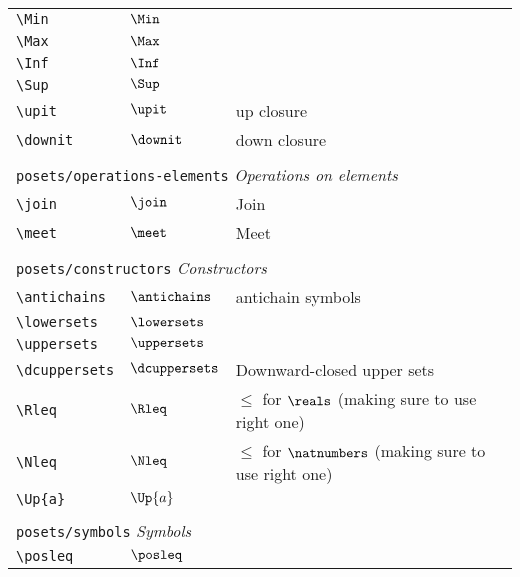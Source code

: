 \begin{longtable}{lll}
 \hline
{\color[rgb]{0.5,0.5,0.5}\texttt{\textbackslash Min}} & $\Min$ & \\ 
 {\color[rgb]{0.5,0.5,0.5}\texttt{\textbackslash Max}} & $\Max$ & \\ 
 {\color[rgb]{0.5,0.5,0.5}\texttt{\textbackslash Inf}} & $\Inf$ & \\ 
 {\color[rgb]{0.5,0.5,0.5}\texttt{\textbackslash Sup}} & $\Sup$ & \\ 
 {\color[rgb]{0.5,0.5,0.5}\texttt{\textbackslash upit}} & $\upit$ &  up closure\\ 
 {\color[rgb]{0.5,0.5,0.5}\texttt{\textbackslash downit}} & $\downit$ &  down closure\\ 
  &  & \\ 
 \multicolumn{3}{l}{{\color[rgb]{0.5,0.5,0.5}\texttt{posets/operations-elements}} \emph{Operations on elements}}\\ 
 \hline
{\color[rgb]{0.5,0.5,0.5}\texttt{\textbackslash join}} & $\join$ &  Join\\ 
 {\color[rgb]{0.5,0.5,0.5}\texttt{\textbackslash meet}} & $\meet$ &  Meet\\ 
  &  & \\ 
 \multicolumn{3}{l}{{\color[rgb]{0.5,0.5,0.5}\texttt{posets/constructors}} \emph{Constructors}}\\ 
 \hline
{\color[rgb]{0.5,0.5,0.5}\texttt{\textbackslash antichains}} & $\antichains$ &  antichain symbols\\ 
 {\color[rgb]{0.5,0.5,0.5}\texttt{\textbackslash lowersets}} & $\lowersets$ & \\ 
 {\color[rgb]{0.5,0.5,0.5}\texttt{\textbackslash uppersets}} & $\uppersets$ & \\ 
 {\color[rgb]{0.5,0.5,0.5}\texttt{\textbackslash dcuppersets}} & $\dcuppersets$ &  Downward-closed upper sets\\ 
 {\color[rgb]{0.5,0.5,0.5}\texttt{\textbackslash Rleq}} & $\Rleq$ &  $\leq$ for $\reals$ (making sure to use right one)\\ 
 {\color[rgb]{0.5,0.5,0.5}\texttt{\textbackslash Nleq}} & $\Nleq$ &  $\leq$ for $\natnumbers$ (making sure to use right one)\\ 
 {\color[rgb]{0.5,0.5,0.5}\texttt{\textbackslash Up\{a\}}} & $\Up{a}$ & \\ 
  &  & \\ 
 \multicolumn{3}{l}{{\color[rgb]{0.5,0.5,0.5}\texttt{posets/symbols}} \emph{Symbols}}\\ 
 \hline
{\color[rgb]{0.5,0.5,0.5}\texttt{\textbackslash posleq}} & $\posleq$ & \\ 

\end{longtable}
